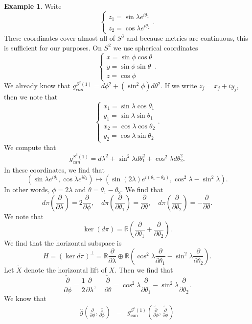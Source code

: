 \documentclass{amsart}
\numberwithin{equation}{section}
\newcommand{\bR}{\mathbb{R}}
\theoremstyle{definition}
\newtheorem{example}[definition]{Example}
\theoremstyle{theorem}
\begin{document}
\begin{example}
Write 
\[
\begin{cases}
z_1 = \sin \lambda e^{i\theta_1} \\
z_2 = \cos\lambda e^{i\theta_2}
\end{cases}.
\]
These coordinates cover almost all of $S^3$ and because metrics are continuous, this is sufficient for our purposes. On $S^2$ we use spherical coordinates
\[
\begin{cases}
x = \sin \phi \cos\theta \\
y = \sin \phi \sin \theta \\
z = \cos \phi
\end{cases}.
\]
We already know that $g_{can}^{S^2(1)} = d\phi^2 + (\sin^2\phi )d\theta^2$. If we write $z_j = x_j + iy_j$, then we note that  
\[
\begin{cases}
x_1 = \sin\lambda \cos\theta_1 \\
y_1 = \sin\lambda \sin\theta_1 \\
x_2 = \cos\lambda \cos \theta_2 \\
y_2 = \cos\lambda \sin \theta_2
\end{cases}.
\]
We compute that 
\begin{align*}
g_{can}^{S^3(1)} = d\lambda^2 + \sin^2\lambda d\theta_1^2 + \cos^2\lambda d\theta_2^2.
\end{align*}
In these coordinates, we find that 
\[
(\sin\lambda e^{i\theta_1}, \cos\lambda e^{i\theta_2}) \mapsto (\sin(2\lambda)e^{i(\theta_1 - \theta_2)}, \cos^2\lambda - \sin^2\lambda).
\]
In other words, $\phi = 2 \lambda$ and $\theta = \theta_1 - \theta_2$. We find that 
$$
d\pi(\frac{\partial}{\partial \lambda}) = 2 \frac{\partial}{\partial \phi},\quad
d\pi(\frac{\partial}{\partial \theta_1}) = \frac{\partial}{\partial \theta},\quad
d\pi(\frac{\partial}{\partial \theta_2}) = - \frac{\partial}{\partial \theta}.
$$
We note that 
\[
\ker(d\pi) = \bR(\frac{\partial}{\partial \theta_1} + \frac{\partial}{\partial \theta_2}).
\]
We find that the horizontal subspace is  
\[
H= (\ker d\pi)^\perp = \bR \frac{\partial}{\partial \lambda} \oplus 
\bR(\cos^2\lambda \frac{\partial}{\partial \theta_1} - \sin^2\lambda \frac{\partial}{\partial \theta_2}).
\]
Let $\tilde{X}$ denote the horizontal lift of $X$. Then we find that 
$$
\widetilde{\frac{\partial}{\partial \phi}} = \frac{1}{2} \frac{\partial}{\partial \lambda},\quad
\widetilde{\frac{\partial}{\partial \theta}} = \cos^2\lambda \frac{\partial}{\partial \theta_1} - \sin^2\lambda \frac{\partial}{\partial \theta_2}.
$$
We know that 
\begin{eqnarray*}
\hat{g}(\frac{\partial}{\partial \phi}, \frac{\partial}{\partial \phi}) &=& g_\mathrm{can}^{S^3(1)} (\widetilde{\frac{\partial}{\partial \phi}}, \widetilde{\frac{\partial}{\partial \phi}}) 

\end{eqnarray*}
\end{example}
\end{document}
